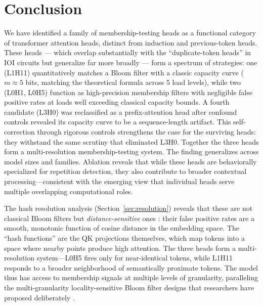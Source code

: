 \documentclass[11pt]{article}
\begin{document}
\section{Conclusion}

We have identified a family of membership-testing heads as a functional category of transformer attention heads, distinct from induction and previous-token heads. These heads --- which overlap substantially with the ``duplicate-token heads'' in IOI circuits \citep{wang2022interpretability} but generalize far more broadly --- form a spectrum of strategies: one (L1H11) quantitatively matches a Bloom filter with a classic capacity curve ($m \approx 5$ bits, matching the theoretical formula across 5 load levels), while two (L0H1, L0H5) function as high-precision membership filters with negligible false positive rates at loads well exceeding classical capacity bounds. A fourth candidate (L3H0) was reclassified as a prefix-attention head after confound controls revealed its capacity curve to be a sequence-length artifact. This self-correction through rigorous controls strengthens the case for the surviving heads: they withstand the same scrutiny that eliminated L3H0. Together the three heads form a multi-resolution membership-testing system. The finding generalizes across model sizes and families. Ablation reveals that while these heads are behaviorally specialized for repetition detection, they also contribute to broader contextual processing---consistent with the emerging view that individual heads serve multiple overlapping computational roles.

The hash resolution analysis (Section~\ref{sec:resolution}) reveals that these are not classical Bloom filters but \emph{distance-sensitive} ones \citep{kirsch2006distance}: their false positive rates are a smooth, monotonic function of cosine distance in the embedding space. The ``hash functions'' are the QK projections themselves, which map tokens into a space where nearby points produce high attention. The three heads form a multi-resolution system---L0H5 fires only for near-identical tokens, while L1H11 responds to a broader neighborhood of semantically proximate tokens. The model thus has access to membership signals at multiple levels of granularity, paralleling the multi-granularity locality-sensitive Bloom filter designs that researchers have proposed deliberately \citep{hua2012locality}.
\end{document}
